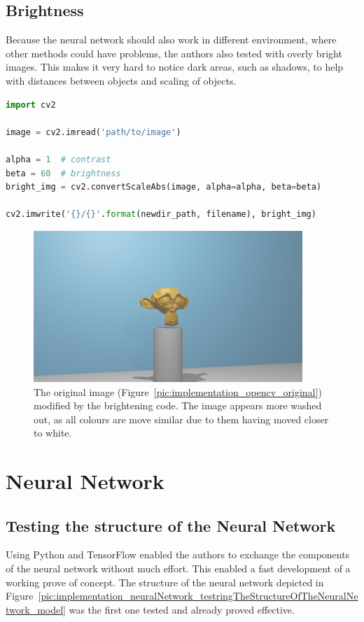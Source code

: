 \subsection{Brightness}
Because the neural network should also work in different environment, where other methods could have problems, the authors also tested with overly bright images. This makes it very hard to notice dark areas, such as shadows, to help with distances between objects and scaling of objects.

\begin{lstlisting}[language=python]
import cv2

image = cv2.imread('path/to/image')

alpha = 1  # contrast
beta = 60  # brightness
bright_img = cv2.convertScaleAbs(image, alpha=alpha, beta=beta)

cv2.imwrite('{}/{}'.format(newdir_path, filename), bright_img)
\end{lstlisting}

\begin{figure}[h!]
	\centering
	\includegraphics[width=4in]{img/implementation_opencv_brightness.jpg}
	\caption{The original image (Figure~\ref{pic:implementation_opencv_original}) modified by the brightening code. The image appears more washed out, as all colours are move similar due to them having moved closer to white.}
	\label{pic:implementation_opencv_brightness}
\end{figure}

\section{Neural Network}
\subsection{Testing the structure of the Neural Network}
Using Python and TensorFlow enabled the authors to exchange the components of the neural network without much effort. This enabled a fast development of a working prove of concept. The structure of the neural network depicted in Figure~\ref{pic:implementation_neuralNetwork_testringTheStructureOfTheNeuralNetwork_model} was the first one tested and already proved effective.

